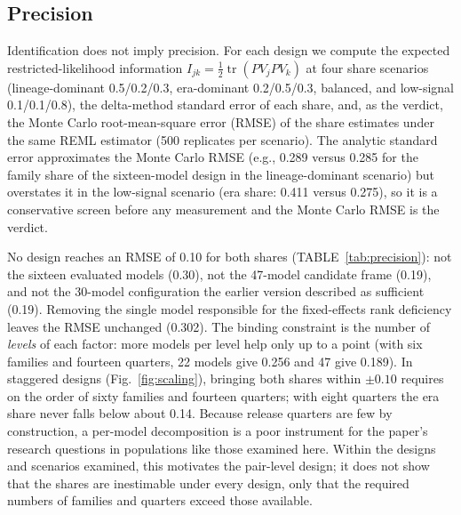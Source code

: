 \documentclass[10pt]{article}
\begin{document}
\subsection*{Precision}
Identification does not imply precision. For each design we compute the expected restricted-likelihood information $I_{jk} = \tfrac12\operatorname{tr}(P V_j P V_k)$ at four share scenarios (lineage-dominant 0.5/0.2/0.3, era-dominant 0.2/0.5/0.3, balanced, and low-signal 0.1/0.1/0.8), the delta-method standard error of each share, and, as the verdict, the Monte Carlo root-mean-square error (RMSE) of the share estimates under the same REML estimator (500 replicates per scenario). The analytic standard error approximates the Monte Carlo RMSE (e.g., 0.289 versus 0.285 for the family share of the sixteen-model design in the lineage-dominant scenario) but overstates it in the low-signal scenario (era share: 0.411 versus 0.275), so it is a conservative screen before any measurement and the Monte Carlo RMSE is the verdict.

\begin{table}[H]
\caption{\textbf{Precision of family and era variance shares for per-model traits.} FE: fixed-effects dummy design used as a gate in the earlier version; $\kappa$ range is over every choice of reference levels. Covariance-basis rank 3/3 means the variance components are identified. The last column is the worst-case Monte Carlo RMSE of either share across four scenarios (500 replicates each).}
\label{tab:precision}
\centering
\footnotesize
{}
\end{table}

No design reaches an RMSE of 0.10 for both shares (TABLE~\ref{tab:precision}): not the sixteen evaluated models (0.30), not the 47-model candidate frame (0.19), and not the 30-model configuration the earlier version described as sufficient (0.19). Removing the single model responsible for the fixed-effects rank deficiency leaves the RMSE unchanged (0.302). The binding constraint is the number of \emph{levels} of each factor: more models per level help only up to a point (with six families and fourteen quarters, 22 models give 0.256 and 47 give 0.189). In staggered designs (Fig.~\ref{fig:scaling}), bringing both shares within $\pm 0.10$ requires on the order of sixty families and fourteen quarters; with eight quarters the era share never falls below about 0.14. Because release quarters are few by construction, a per-model decomposition is a poor instrument for the paper's research questions in populations like those examined here. Within the designs and scenarios examined, this motivates the pair-level design; it does not show that the shares are inestimable under every design, only that the required numbers of families and quarters exceed those available.
\end{document}
